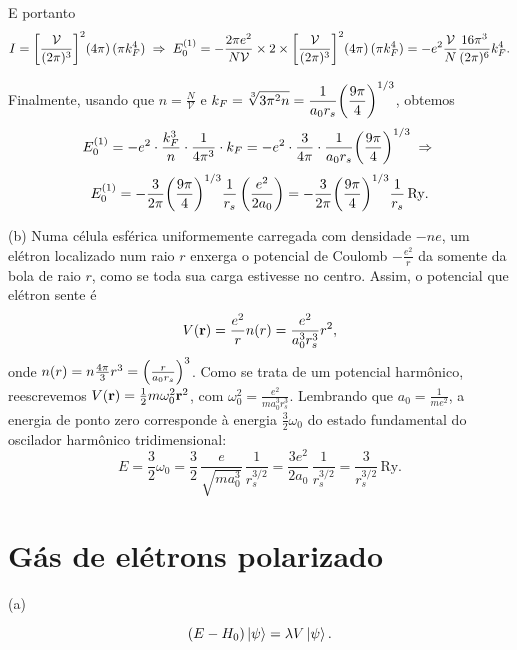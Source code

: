 \documentclass[a4paper,10pt]{article}
\begin{document}
E portanto
$$
I = \qty[\frac{\mathcal{V}}{(2\pi)^3}]^2 (4\pi) \, (\pi k_F^4) \; \Rightarrow \;
E_0^{(1)} = - \frac{2 \pi e^2}{N \mathcal{V}} \times 2 \times
\qty[\frac{\mathcal{V}}{(2\pi)^3}]^2 (4\pi) \, (\pi k_F^4)
= - e^2 \frac{\mathcal{V}}{N}
\frac{16 \pi^3 }{(2\pi)^6} k_F^4 .
$$

Finalmente, usando que $n = \frac{N}{\mathcal{V}}$ e $\displaystyle{ k_F = \sqrt[3]{3 \pi^2 n} = \frac{1}{a_0 r_s} \qty(\frac{9\pi}{4})^{1/3} }$, obtemos
$$
E_0^{(1)} =
- e^2 \cdot \frac{k_F^3}{n} \cdot
\frac{1}{4 \pi^3} \cdot k_F =
- e^2 \cdot
\frac{3}{4 \pi} \cdot \frac{1}{a_0 r_s} \qty(\frac{9\pi}{4})^{1/3} \; \Rightarrow \;
$$
$$
E_0^{(1)} =
- \frac{3}{2\pi} \qty(\frac{9\pi}{4})^{1/3} \frac{1}{r_s} \, \qty(\frac{e^2}{2a_0})
= - \frac{3}{2\pi} \qty(\frac{9\pi}{4})^{1/3} \frac{1}{r_s} \, \text{Ry}.
$$

(b) Numa célula esférica uniformemente carregada com densidade $- ne$, um elétron localizado num raio $r$ enxerga o potencial de Coulomb $-\frac{e^2}{r}$ da somente da bola de raio $r$, como se toda sua carga estivesse no centro. Assim, o potencial que elétron sente é
$$
V(\vb{r}) = \frac{e^2}{r} n(r) = \frac{e^2}{a_0^3 r_s^3} r^2,
$$
onde $n(r) = n \frac{4 \pi}{3} r^3 = \qty(\frac{r}{a_0 r_s})^3$. Como se trata de um potencial harmônico, reescrevemos $V(\vb{r}) = \frac{1}{2} m \omega_0^2 \vb{r}^2$, com $\omega_0^2 = \frac{e^2}{m a_0^3 r_s^3}$. Lembrando que $a_0 = \frac{1}{m e^2}$, a energia de ponto zero corresponde à energia $\frac{3}{2} \omega_0$ do estado fundamental do oscilador harmônico tridimensional:
$$
E = \frac{3}{2} \omega_0 =
\frac{3}{2} \, \frac{e}{\sqrt{m a_0^3}} \, \frac{1}{r_s^{3/2}} =
\frac{3 e^2}{2 a_0} \, \frac{1}{r_s^{3/2}} = \frac{3}{r_s^{3/2}} \, \text{Ry}.
$$


\pagebreak

\section{Gás de elétrons polarizado}

(a)



\pagebreak

\begin{equation} \label{eq:pertub}
(E - H_0) \ket{\psi} = \lambda V \ket{\psi}.
\end{equation}
\end{document}
